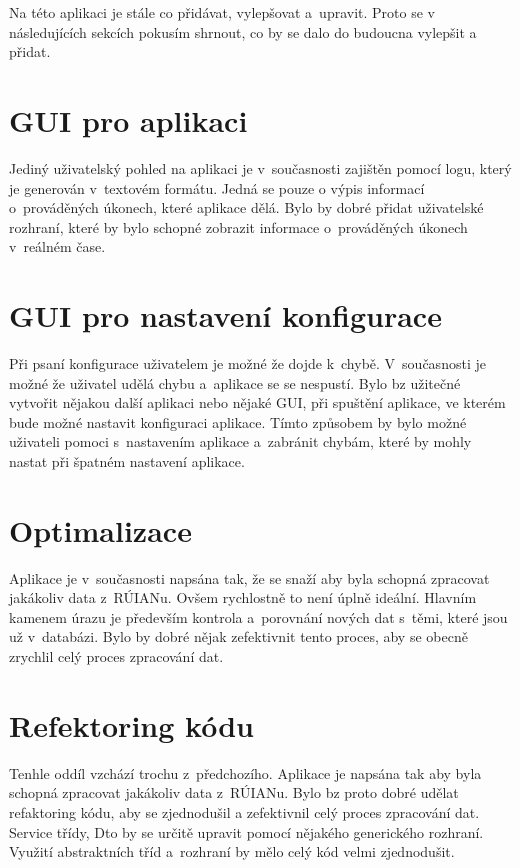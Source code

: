 \label{cha:NavrhDoBudoucna}
Na této aplikaci je stále co přidávat, vylepšovat a~upravit.
Proto se v následujících sekcích pokusím shrnout, co by se 
dalo do budoucna vylepšit a přidat.

\section*{GUI pro aplikaci}
Jediný uživatelský pohled na aplikaci je v~současnosti zajištěn pomocí 
logu, který je generován v~textovém formátu. Jedná se pouze o výpis
informací o~prováděných úkonech, které aplikace dělá.
Bylo by dobré přidat uživatelské rozhraní, které by bylo schopné
zobrazit informace o~prováděných úkonech v~reálném čase.


\section*{GUI pro nastavení konfigurace}
Při psaní konfigurace uživatelem je možné že dojde k~chybě.
V~současnosti je možné že uživatel udělá chybu a~aplikace se 
se nespustí. Bylo bz užitečné vytvořit nějakou další aplikaci nebo nějaké GUI,
při spuštění aplikace, ve kterém bude možné nastavit konfiguraci aplikace.
Tímto způsobem by bylo možné uživateli pomoci s~nastavením aplikace
a~zabránit chybám, které by mohly nastat při špatném nastavení aplikace.


\section*{Optimalizace}
Aplikace je v~současnosti napsána tak, že se snaží aby byla schopná
zpracovat jakákoliv data z~RÚIANu. Ovšem rychlostně to není
úplně ideální. Hlavním kamenem úrazu je především kontrola
a~porovnání nových dat s~těmi, které jsou už v~databázi.
Bylo by dobré nějak zefektivnit tento proces, aby se obecně zrychlil
celý proces zpracování dat.


\section*{Refektoring kódu}
Tenhle oddíl vzchází trochu z~předchozího. Aplikace je napsána
tak aby byla schopná zpracovat jakákoliv data z~RÚIANu.
Bylo bz proto dobré udělat refaktoring kódu, aby se zjednodušil
a zefektivnil celý proces zpracování dat. Service třídy, Dto 
by se určitě upravit pomocí nějakého generického rozhraní.
Využití abstraktních tříd a~rozhraní by mělo celý kód velmi
zjednodušit.


